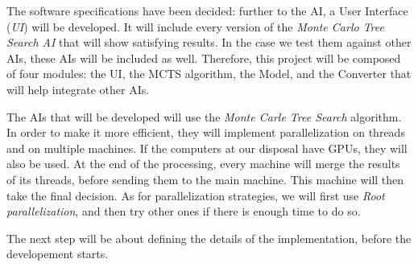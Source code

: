 The software specifications have been decided: further to the AI, a User Interface (\emph{UI}) will be developed.
It will include every version of the \textit{Monte Carlo Tree Search AI} that will show satisfying results.
In the case we test them against other AIs, these AIs will be included as well.
Therefore, this project will be composed of four modules: the UI, the MCTS algorithm, the Model, and the Converter that will help integrate other AIs.

The AIs that will be developed will use the \emph{Monte Carle Tree Search} algorithm.
In order to make it more efficient, they will implement parallelization on threads and on multiple machines.
If the computers at our disposal have GPUs, they will also be used.
At the end of the processing, every machine will merge the results of its threads, before sending them to the main machine.
This machine will then take the final decision.
As for parallelization strategies, we will first use \emph{Root parallelization}, and then try other ones if there is enough time to do so.

The next step will be about defining the details of the implementation, before the developement starts.